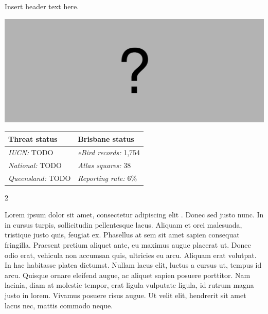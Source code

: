 \documentclass[12pt,openany,oneside]{book}
\let\origfigure\figure
\let\endorigfigure\endfigure
\renewenvironment{figure}[1][2] {
  \expandafter\origfigure\expandafter[H]
} {
  \endorigfigure
}
\let\Begin\begin
\let\End\end
\theoremstyle{definition}
\theoremstyle{definition}
\theoremstyle{definition}
\theoremstyle{remark}
\begin{document}

Insert header text here.

\begin{figure}
\centering
\includegraphics[width=\textwidth,keepaspectratio=true]{assets/misc/missing-profile.png}
\caption{Insert caption here.}
\end{figure}

\begin{tabu} to 
\toprule
Threat status & Brisbane status\\
\midrule
\textit{IUCN:} TODO & \textit{eBird records:} 1,754\\
\textit{National:} TODO & \textit{Atlas squares:} 38\\
\textit{Queensland:} TODO & \textit{Reporting rate:} 6\%\\
\bottomrule
\end{tabu} 
\vspace{0.15cm}

\Begin{multicols}{2}

Lorem ipsum dolor sit amet, consectetur adipiscing elit
\citep{rexample1, rexample2, rexample3}. Donec sed justo nunc. In in
cursus turpis, sollicitudin pellentesque lacus. Aliquam et orci
malesuada, tristique justo quis, feugiat ex. Phasellus at sem sit amet
sapien consequat fringilla. Praesent pretium aliquet ante, eu maximus
augue placerat ut. Donec odio erat, vehicula non accumsan quis,
ultricies eu arcu. Aliquam erat volutpat. In hac habitasse platea
dictumst. Nullam lacus elit, luctus a cursus ut, tempus id arcu. Quisque
ornare eleifend augue, ac aliquet sapien posuere porttitor. Nam lacinia,
diam at molestie tempor, erat ligula vulputate ligula, id rutrum magna
justo in lorem. Vivamus posuere risus augue. Ut velit elit, hendrerit
sit amet lacus nec, mattis commodo neque.

\End{multicols}

\clearpage
\end{document}
